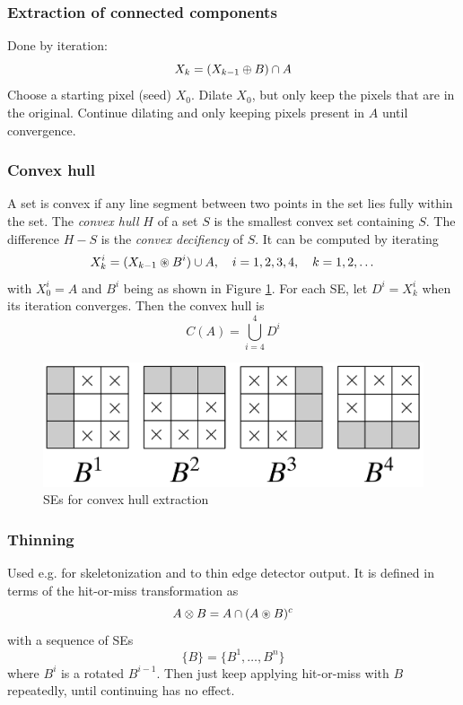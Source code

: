 \subsubsection{Extraction of connected components}\label{sec:extract-connected}
Done by iteration:
\begin{equation}
    X_k = (X_{k-1} \oplus B) \cap A
\end{equation}
Choose a starting pixel (seed) $X_0$. Dilate $X_0$, but only keep the pixels that are in the original. Continue dilating and only keeping pixels present in $A$ until convergence.

\subsubsection{Convex hull}\label{sec:convex-hull}
A set is convex if any line segment between two points in the set lies fully within the set. The \emph{convex hull} $H$ of a set $S$ is the smallest convex set containing $S$. The difference $H - S$ is the \emph{convex decifiency} of $S$. It can be computed by iterating
\begin{equation}
    X_k^i = (X_{k-1} \circledast B^i) \cup A
    ,\quad i = 1,2,3,4
    ,\quad k = 1,2,\dots
\end{equation}
with $X_0^i = A$ and $B^i$ being as shown in Figure \ref{fig:convex-hull-SE}. For each SE, let $D^i = X_k^i$ when its iteration converges. Then the convex hull is
\begin{equation}
    C(A) = \bigcup_{i=4}^{4} D^i
\end{equation}

\begin{figure}[htbp]
    \centering
    \includegraphics[width=.5\linewidth]{images/SE-for-convex-hull.png}
    \caption{SEs for convex hull extraction}
    \label{fig:convex-hull-SE}
\end{figure}

\subsubsection{Thinning}\label{sec:thinning}
Used e.g. for skeletonization and to thin edge detector output. It is defined in terms of the hit-or-miss transformation as
\begin{equation}
    A \otimes B = A \cap (A \circledast B)^c
\end{equation}
with a sequence of SEs
\begin{equation}
    \{ B \} = \{ B^1, \dots, B^n \}
\end{equation}
where $B^i$ is a rotated $B^{i-1}$. Then just keep applying hit-or-miss with $B$ repeatedly, until continuing has no effect.

